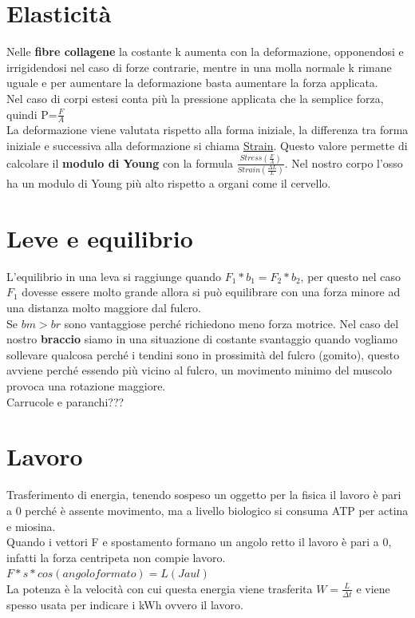 \documentclass[10pt]{article}
\begin{document}
\section*{Elasticità}
Nelle \textbf{fibre collagene} la costante k aumenta con la deformazione, opponendosi e irrigidendosi nel caso di forze contrarie, mentre in una molla normale k rimane uguale e per aumentare la deformazione basta aumentare la forza applicata. \\
Nel caso di corpi estesi conta più la pressione applicata che la semplice forza, quindi P=$\frac{F}{A}$\\
La deformazione viene valutata rispetto alla forma iniziale, la differenza tra forma iniziale e successiva alla deformazione si chiama \underline{Strain}. Questo valore permette di calcolare il \textbf{modulo di Young} con la formula $\frac{Stress (\frac{F}{A})}{Strain(\frac{\Delta L}{L})}$. Nel nostro corpo l'osso ha un modulo di Young più alto rispetto a organi come il cervello.
\section*{Leve e equilibrio}
L'equilibrio in una leva si raggiunge quando $F_1*b_1=F_2*b_2$, per questo nel caso $F_1$ dovesse essere molto grande allora si può equilibrare con una forza minore ad una distanza molto maggiore dal fulcro.\\
Se $bm>br$ sono vantaggiose perché richiedono meno forza motrice. Nel caso del nostro \textbf{braccio} siamo in una situazione di costante svantaggio quando vogliamo sollevare qualcosa perché i tendini sono in prossimità del fulcro (gomito), questo avviene perché essendo più vicino al fulcro, un movimento minimo del muscolo provoca una rotazione maggiore. \\
Carrucole e paranchi???
\section*{Lavoro}
Trasferimento di energia, tenendo sospeso un oggetto per la fisica il lavoro è pari a 0 perché è assente movimento, ma a livello biologico si consuma ATP per actina e miosina. \\
Quando i vettori F e spostamento formano un angolo retto il lavoro è pari a 0, infatti la forza centripeta non compie lavoro. $F*s*cos(angolo formato)= L(Jaul)$\\
La potenza è la velocità con cui questa energia viene trasferita $W=\frac{L}{\Delta t}$ e viene spesso usata per indicare i kWh ovvero il lavoro.
\end{document}
